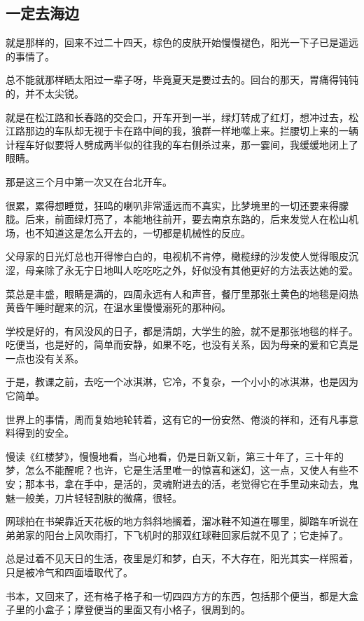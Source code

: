 \subsection{一定去海边}


\par 就是那样的，回来不过二十四天，棕色的皮肤开始慢慢褪色，阳光一下子已是遥远的事情了。
\par 总不能就那样晒太阳过一辈子呀，毕竟夏天是要过去的。回台的那天，胃痛得钝钝的，并不太尖锐。
\par 就是在松江路和长春路的交会口，开车开到一半，绿灯转成了红灯，想冲过去，松江路那边的车队却无视于卡在路中间的我，狼群一样地噬上来。拦腰切上来的一辆计程车好似要将人劈成两半似的往我的车右侧杀过来，那一霎间，我缓缓地闭上了眼睛。
\par 那是这三个月中第一次又在台北开车。
\par 很累，累得想睡觉，狂鸣的喇叭非常遥远而不真实，比梦境里的一切还要来得朦胧。后来，前面绿灯亮了，本能地往前开，要去南京东路的，后来发觉人在松山机场，也不知道这是怎么开去的，一切都是机械性的反应。
\par 父母家的日光灯总也开得惨白白的，电视机不肯停，橄榄绿的沙发使人觉得眼皮沉涩，母亲除了永无宁日地叫人吃吃吃之外，好似没有其他更好的方法表达她的爱。
\par 菜总是丰盛，眼睛是满的，四周永远有人和声音，餐厅里那张土黄色的地毯是闷热黄昏午睡时醒来的沉，在温水里慢慢溺死的那种闷。
\par 学校是好的，有风没风的日子，都是清朗，大学生的脸，就不是那张地毯的样子。吃便当，也是好的，简单而安静，如果不吃，也没有关系，因为母亲的爱和它真是一点也没有关系。
\par 于是，教课之前，去吃一个冰淇淋，它冷，不复杂，一个小小的冰淇淋，也是因为它简单。
\par 世界上的事情，周而复始地轮转着，这有它的一份安然、倦淡的祥和，还有凡事意料得到的安全。
\par 慢读《红楼梦》，慢慢地看，当心地看，仍是日新又新，第三十年了，三十年的梦，怎么不能醒呢？也许，它是生活里唯一的惊喜和迷幻，这一点，又使人有些不安；那本书，拿在手中，是活的，灵魂附进去的活，老觉得它在手里动来动去，鬼魅一般美，刀片轻轻割肤的微痛，很轻。
\par 网球拍在书架靠近天花板的地方斜斜地搁着，溜冰鞋不知道在哪里，脚踏车听说在弟弟家的阳台上风吹雨打，下飞机时的那双红球鞋回家后就不见了；它走掉了。
\par 总是过着不见天日的生活，夜里是灯和梦，白天，不大存在，阳光其实一样照着，只是被冷气和四面墙取代了。
\par 书本，又回来了，还有格子格子和一切四四方方的东西，包括那个便当，都是大盒子里的小盒子；摩登便当的里面又有小格子，很周到的。

